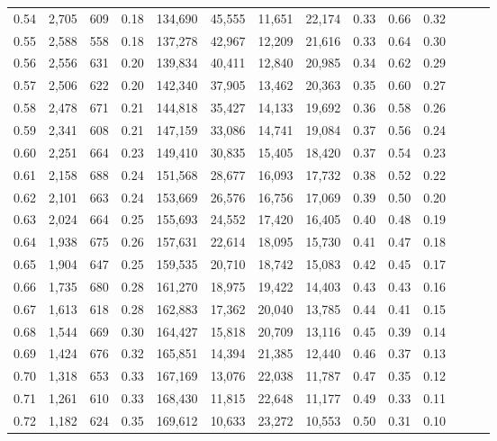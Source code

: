 \begin{tabular}{rrrrrrrrrrrrrr}
0.54 &  2,705 &  609 &  0.18 &  134,690 &   45,555 &  11,651 &  22,174 &  0.33 &  0.66 &      0.32 \\
0.55 &  2,588 &  558 &  0.18 &  137,278 &   42,967 &  12,209 &  21,616 &  0.33 &  0.64 &      0.30 \\
0.56 &  2,556 &  631 &  0.20 &  139,834 &   40,411 &  12,840 &  20,985 &  0.34 &  0.62 &      0.29 \\
0.57 &  2,506 &  622 &  0.20 &  142,340 &   37,905 &  13,462 &  20,363 &  0.35 &  0.60 &      0.27 \\
0.58 &  2,478 &  671 &  0.21 &  144,818 &   35,427 &  14,133 &  19,692 &  0.36 &  0.58 &      0.26 \\
0.59 &  2,341 &  608 &  0.21 &  147,159 &   33,086 &  14,741 &  19,084 &  0.37 &  0.56 &      0.24 \\
0.60 &  2,251 &  664 &  0.23 &  149,410 &   30,835 &  15,405 &  18,420 &  0.37 &  0.54 &      0.23 \\
0.61 &  2,158 &  688 &  0.24 &  151,568 &   28,677 &  16,093 &  17,732 &  0.38 &  0.52 &      0.22 \\
0.62 &  2,101 &  663 &  0.24 &  153,669 &   26,576 &  16,756 &  17,069 &  0.39 &  0.50 &      0.20 \\
0.63 &  2,024 &  664 &  0.25 &  155,693 &   24,552 &  17,420 &  16,405 &  0.40 &  0.48 &      0.19 \\
0.64 &  1,938 &  675 &  0.26 &  157,631 &   22,614 &  18,095 &  15,730 &  0.41 &  0.47 &      0.18 \\
0.65 &  1,904 &  647 &  0.25 &  159,535 &   20,710 &  18,742 &  15,083 &  0.42 &  0.45 &      0.17 \\
0.66 &  1,735 &  680 &  0.28 &  161,270 &   18,975 &  19,422 &  14,403 &  0.43 &  0.43 &      0.16 \\
0.67 &  1,613 &  618 &  0.28 &  162,883 &   17,362 &  20,040 &  13,785 &  0.44 &  0.41 &      0.15 \\
0.68 &  1,544 &  669 &  0.30 &  164,427 &   15,818 &  20,709 &  13,116 &  0.45 &  0.39 &      0.14 \\
0.69 &  1,424 &  676 &  0.32 &  165,851 &   14,394 &  21,385 &  12,440 &  0.46 &  0.37 &      0.13 \\
0.70 &  1,318 &  653 &  0.33 &  167,169 &   13,076 &  22,038 &  11,787 &  0.47 &  0.35 &      0.12 \\
0.71 &  1,261 &  610 &  0.33 &  168,430 &   11,815 &  22,648 &  11,177 &  0.49 &  0.33 &      0.11 \\
0.72 &  1,182 &  624 &  0.35 &  169,612 &   10,633 &  23,272 &  10,553 &  0.50 &  0.31 &      0.10 \\

\end{tabular}
